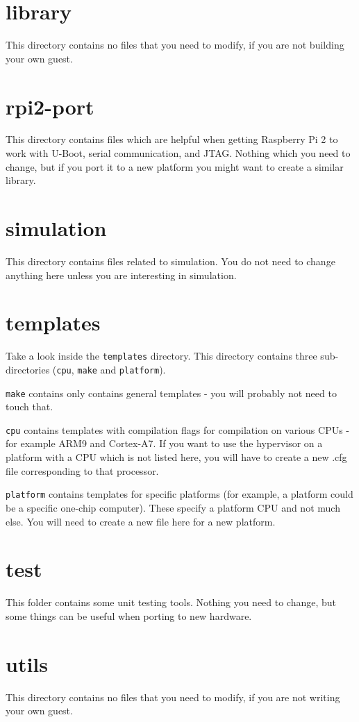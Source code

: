 \documentclass[a4paper,11pt,reqno]{amsart}
\begin{document}
\section{library}

This directory contains no files that you need to modify, if you are not building your own guest.

\section{rpi2-port}

This directory contains files which are helpful when getting Raspberry Pi 2 to work with U-Boot, serial communication, and JTAG. Nothing which you need to change, but if you port it to a new platform you might want to create a similar library.

\section{simulation}

This directory contains files related to simulation. You do not need to change anything here unless you are interesting in simulation.

\section{templates}
Take a look inside the \texttt{templates} directory. This directory contains three sub-directories (\texttt{cpu}, \texttt{make} and \texttt{platform}).

\texttt{make} contains only contains general templates - you will probably not need to touch that. 

\texttt{cpu} contains templates with compilation flags for compilation on various CPUs - for example ARM9 and Cortex-A7. If you want to use the hypervisor on a platform with a CPU which is not listed here, you will have to create a new .cfg file corresponding to that processor.

\texttt{platform} contains templates for specific platforms (for example, a platform could be a specific one-chip computer). These specify a platform CPU and not much else. You will need to create a new file here for a new platform.

\section{test}

This folder contains some unit testing tools. Nothing you need to change, but some things can be useful when porting to new hardware.

\section{utils}

This directory contains no files that you need to modify, if you are not writing your own guest.
\end{document}
